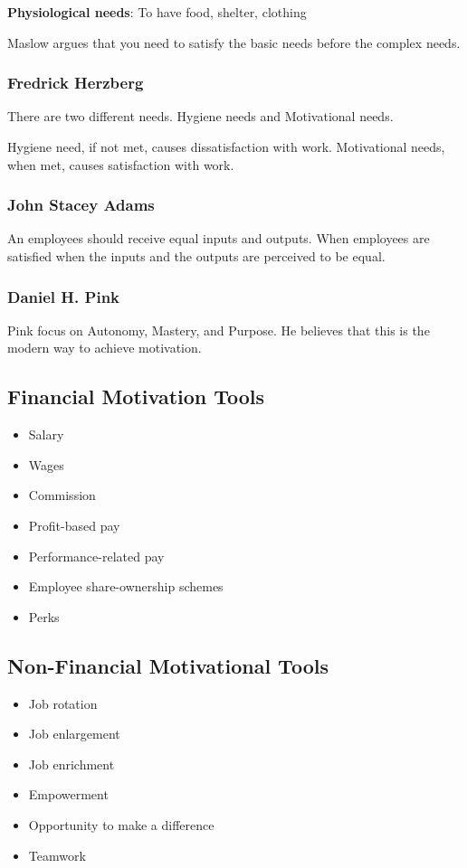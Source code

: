 \documentclass{standalone}
\begin{document}
\textbf{Physiological needs}: To have food, shelter, clothing

Maslow argues that you need to satisfy the basic needs before the complex needs.

\subsubsection{Fredrick Herzberg}
There are two different needs.
Hygiene needs and Motivational needs.

Hygiene need, if not met, causes dissatisfaction with work.
Motivational needs, when met, causes satisfaction with work.

\subsubsection{John Stacey Adams}
An employees should receive equal inputs and outputs.
When employees are satisfied when the inputs and the outputs are perceived to be equal.

\subsubsection{Daniel H. Pink}
Pink focus on Autonomy, Mastery, and Purpose.
He believes that this is the modern way to achieve motivation.

\subsection{Financial Motivation Tools}
\begin{itemize}
	\item Salary
	\item Wages
	\item Commission
	\item Profit-based pay
	\item Performance-related pay
	\item Employee share-ownership schemes
	\item Perks
\end{itemize}

\subsection{Non-Financial Motivational Tools}
\begin{itemize}
	\item Job rotation
	\item Job enlargement
	\item Job enrichment
	\item Empowerment
	\item Opportunity to make a difference
	\item Teamwork
\end{itemize}

	
\end{document}
